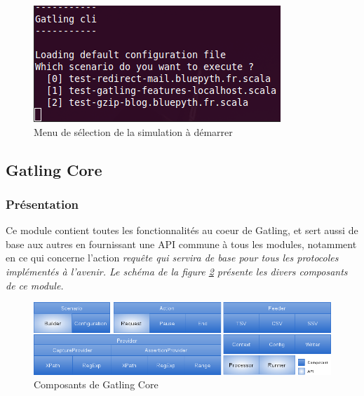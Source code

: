 \begin{figure}[h]
\begin{center}
\includegraphics{img/menu_console.png}
\end{center}
\caption{Menu de sélection de la simulation à démarrer}
\label{menu_console}
\end{figure}

\subsection{Gatling Core}
\subsubsection{Présentation}
Ce module contient toutes les fonctionnalités au coeur de Gatling, et sert aussi de base aux autres en fournissant une API commune à tous les modules, notamment en ce qui concerne l'action \em{requête} qui servira de base pour tous les protocoles implémentés à l'avenir. Le schéma de la figure \ref{gatling_core} présente les divers composants de ce module.

\begin{figure}[h]
\begin{center}
\includegraphics[width=400pt]{img/gatling_core.png}
\end{center}
\caption{Composants de Gatling Core}
\label{gatling_core}
\end{figure}

